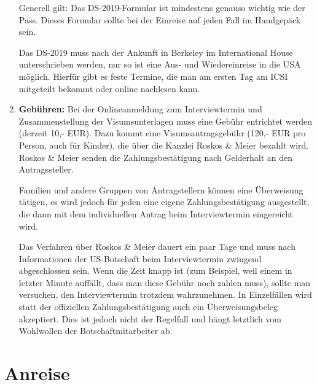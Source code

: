 \documentclass[a4paper]{scrreprt}
\begin{document}
\begin{enumerate}
	Generell gilt: Das DS-2019-Formular ist mindestens genauso wichtig wie der Pass. Dieses Formular sollte bei der
Einreise auf jeden Fall im Handgepäck sein.
	
	Das DS-2019 muss nach der Ankunft in Berkeley im International House unterschrieben werden, nur so ist eine Aus- und Wiedereinreise in die USA m\"oglich. Hierfür gibt es feste Termine, die man am ersten Tag am ICSI mitgeteilt bekommt oder online nachlesen kann.

	\item \textbf{Gebühren:} Bei der Onlineanmeldung zum Interviewtermin und Zusammenstellung der Visumsunterlagen muss eine Gebühr entrichtet werden (derzeit 10,- EUR). Dazu kommt eine Visumsantragsgebühr (120,- EUR pro Person, auch für Kinder), die über die Kanzlei Roskos \& Meier bezahlt wird. Roskos \& Meier senden die Zahlungsbestätigung nach Gelderhalt an den Antragssteller.

	Familien und andere Gruppen von Antragstellern können eine Überweisung tätigen, es wird jedoch für jeden eine eigene Zahlungsbestätigung ausgestellt, die dann mit dem individuellen Antrag beim Interviewtermin eingereicht wird.
	
	Das Verfahren über Roskos \& Meier dauert ein paar Tage und muss nach Informationen der US-Botschaft beim Interviewtermin zwingend abgeschlossen sein. Wenn die Zeit knapp ist (zum Beispiel, weil einem in letzter Minute auffällt, dass man diese Gebühr noch zahlen muss), sollte man versuchen, den Interviewtermin trotzdem wahrzunehmen. In Einzelfällen wird statt der offiziellen Zahlungsbestätigung auch ein Überweisungsbeleg akzeptiert. Dies ist jedoch nicht der Regelfall und hängt letztlich vom Wohlwollen der Botschaftmitarbeiter ab.
	
\end{enumerate}

\section{Anreise}
\end{document}
